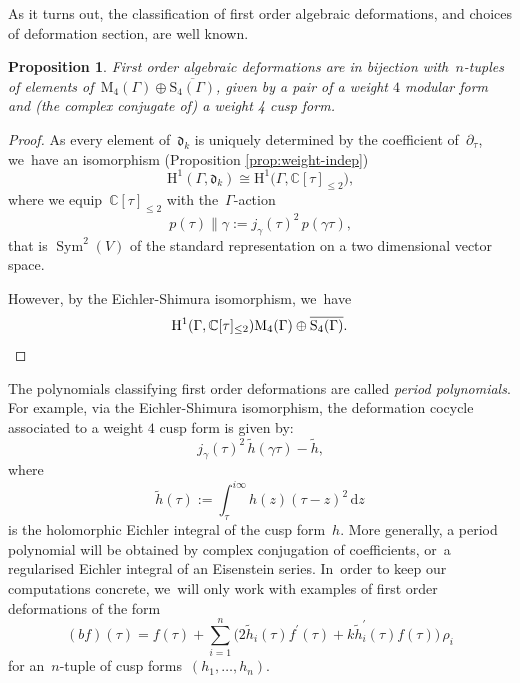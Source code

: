 \documentclass[JEP,XML,SOM,Unicode,published]{cedram}
\theoremstyle{plain}
\newtheorem{proposition}[theoremcounter]{Proposition}
\theoremstyle{definition}
\newcommand{\tx}{\text}
\newcommand{\nbd}{\nobreakdash-\hspace{0pt}}
\newcommand{\bbC}{\ensuremath{\mathbb{C}}}
\newcommand{\frakd}{\ensuremath{\mathfrak{d}}}
\newcommand{\rmd}{\ensuremath{\mathrm{d}}}
\newcommand{\rmH}{\ensuremath{\mathrm{H}}}
\newcommand{\rmM}{\ensuremath{\mathrm{M}}}
\newcommand{\rmS}{\ensuremath{\mathrm{S}}}
\newcommand{\defeq}{:=}
\let\Ga\Gamma
\let\ga\gamma
\DeclareMathOperator{\Sym}{Sym}
\newcommand{\dz}{\rmd z}
\begin{document}
As it turns out, the classification of first order algebraic deformations, and choices of deformation section, are well known.

\begin{proposition}
\label{prop:first-order-cusp-forms}
First order algebraic deformations are in bijection with~$n$-tuples of elements of~$\rmM_4(\Ga)\oplus \overline{\rmS_4(\Ga)}$, given by a pair of a weight $4$ modular form and (the complex conjugate of) a weight 4 cusp form.
\end{proposition}
\begin{proof}
As every element of~$\frakd_k$ is uniquely determined by the coefficient of~$\partial_\tau$, we~have an isomorphism (Proposition \ref{prop:weight-indep})
\begin{equation*}
\rmH^1(\Ga,\frakd_k)
\cong
\rmH^1\bigl(\Ga, \bbC[\tau]_{\leq 2} \bigr)
\tx{,}
\end{equation*}
where we equip~$\bbC[\tau]_{\leq 2}$ with the~$\Ga$\nbd{}action
\begin{equation*}
p(\tau) \big\| \ga
\defeq
j_\ga(\tau)^2\, p(\ga\tau)
\tx{,}
\end{equation*}
that is $\Sym^2(V)$ of the standard representation on a two dimensional vector space.

However, by the Eichler-Shimura isomorphism, we~have
\[
\rmH^1(\Ga,\bbC[\tau]_{\leq 2})\rmM_4(\Ga)\oplus \overline{\rmS_4(\Ga)}.\qedhere
\]
\end{proof}

The polynomials classifying first order deformations are called \emph{period polynomials}. For example, via the Eichler-Shimura isomorphism, the deformation cocycle associated to a weight $4$ cusp form is given by:
\begin{equation*}
j_\ga(\tau)^2\,
\tilde{h}(\ga\tau) - \tilde{h}
\tx{,}
\end{equation*}
where
\begin{equation}\label{eq:eicher-integral-def}
\tilde{h}(\tau)
\defeq
\int_{\tau}^{i\infty} h(z)(\tau-z)^2 \,\dz
\end{equation}
is the holomorphic Eichler integral of the cusp form~$h$. More generally, a period polynomial will be obtained by complex conjugation of coefficients, or~a regularised Eichler integral of an Eisenstein series. In~order to keep our computations concrete, we~will only work with examples of first order deformations of the form
\begin{equation*}
(b f)(\tau)
=
f(\tau)
+
\sum_{i=1}^n
\bigl(2\tilde{h}_i(\tau) f^\prime(\tau) + k \tilde{h}^\prime_i(\tau) f(\tau) \bigr)\, \rho_i
\end{equation*}
for an~$n$-tuple of cusp forms~$(h_1,\ldots,h_n)$.
\end{document}
